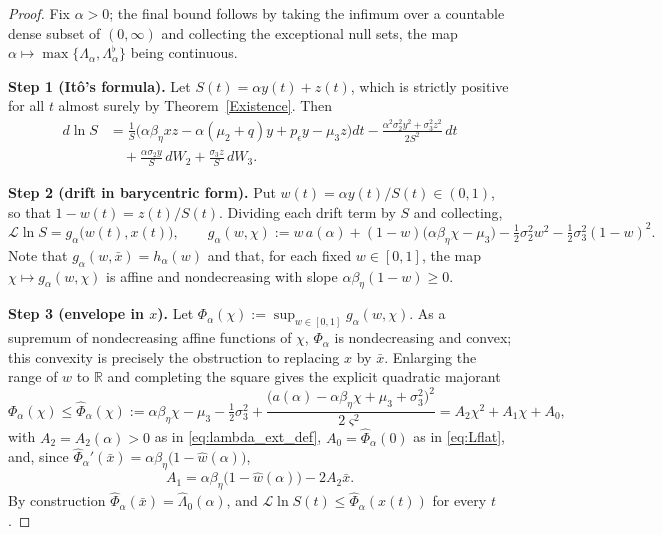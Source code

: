 \documentclass{article}
\newcommand{\betaeta}{\beta_\eta}
\newcommand{\peps}{p_\epsilon}
\begin{document}
\begin{proof}
Fix $\alpha>0$; the final bound follows by taking the infimum over a countable dense subset of $(0,\infty)$ and collecting the exceptional null sets, the map $\alpha\mapsto\max\{\Lambda_\alpha,\Lambda_\alpha^\flat\}$ being continuous.

\textbf{Step 1 (It\^o's formula).} Let $S(t)=\alpha y(t)+z(t)$, which is strictly positive for all $t$ almost surely by Theorem~\ref{Existence}. Then
\begin{align}\label{eq:dV_ext}
d\ln S &= \frac{1}{S}\Big(\alpha\betaeta xz-\alpha(\mu_2+q)y+\peps y-\mu_3z\Big)dt-\frac{\alpha^2\sigma_2^2y^2+\sigma_3^2z^2}{2S^2}\,dt \nonumber\\
&\quad+\frac{\alpha\sigma_2y}{S}\,dW_2+\frac{\sigma_3z}{S}\,dW_3 .
\end{align}

\textbf{Step 2 (drift in barycentric form).} Put $w(t)=\alpha y(t)/S(t)\in(0,1)$, so that $1-w(t)=z(t)/S(t)$. Dividing each drift term by $S$ and collecting,
\begin{equation}\label{eq:LV_w}
\mathcal{L}\ln S = g_\alpha\big(w(t),x(t)\big),\qquad
g_\alpha(w,\chi):=w\,a(\alpha)+(1-w)\big(\alpha\betaeta\chi-\mu_3\big)-\tfrac12\sigma_2^2w^2-\tfrac12\sigma_3^2(1-w)^2 .
\end{equation}
Note that $g_\alpha(w,\bar x)=h_\alpha(w)$ and that, for each fixed $w\in[0,1]$, the map $\chi\mapsto g_\alpha(w,\chi)$ is affine and nondecreasing with slope $\alpha\betaeta(1-w)\ge0$.

\textbf{Step 3 (envelope in $x$).} Let $\Phi_\alpha(\chi):=\sup_{w\in[0,1]}g_\alpha(w,\chi)$. As a supremum of nondecreasing affine functions of $\chi$, $\Phi_\alpha$ is nondecreasing and convex; this convexity is precisely the obstruction to replacing $x$ by $\bar x$. Enlarging the range of $w$ to $\mathbb{R}$ and completing the square gives the explicit quadratic majorant
\begin{equation}\label{eq:Phihat}
\Phi_\alpha(\chi)\le\widehat\Phi_\alpha(\chi):=\alpha\betaeta\chi-\mu_3-\tfrac12\sigma_3^2+\frac{\big(a(\alpha)-\alpha\betaeta\chi+\mu_3+\sigma_3^2\big)^2}{2\varsigma^2}=A_2\chi^2+A_1\chi+A_0 ,
\end{equation}
with $A_2=A_2(\alpha)>0$ as in \eqref{eq:lambda_ext_def}, $A_0=\widehat\Phi_\alpha(0)$ as in \eqref{eq:Lflat}, and, since $\widehat\Phi_\alpha'(\bar x)=\alpha\betaeta\big(1-\widehat w(\alpha)\big)$,
\[
A_1=\alpha\betaeta\big(1-\widehat w(\alpha)\big)-2A_2\bar x .
\]
By construction $\widehat\Phi_\alpha(\bar x)=\widehat\Lambda_0(\alpha)$, and $\mathcal{L}\ln S(t)\le\widehat\Phi_\alpha(x(t))$ for every $t$.


\end{proof}
\end{document}
